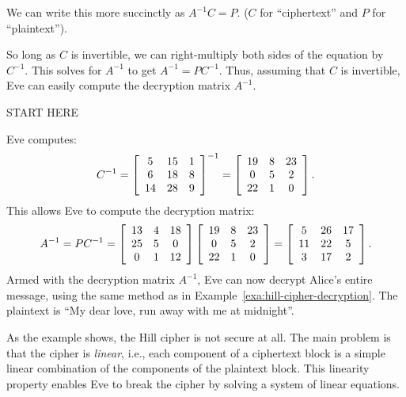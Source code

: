 \documentclass{ximera}
\begin{document}
\begin{solution}
  We can write this more succinctly as $A^{-1}C=P$. ($C$
 for ``ciphertext'' and $P$ for ``plaintext''). 
 
  So long as $C$ is invertible, we can right-multiply 
  both sides of the equation by $C^{-1}$. This solves for $A^{-1}$ to get
  $A^{-1} = PC^{-1}$. Thus, assuming that $C$ is invertible, Eve can
  easily compute the decryption matrix $A^{-1}$. 

  START HERE
  
  Eve computes:
  \begin{equation*}
    C^{-1}
    =
    \startmat{ccc}
      5 & 15 & 1 \\
      6 & 18 & 8 \\
      14 & 28 & 9 \\
    \stopmat^{-1}
    =
    \startmat{ccc}
      19 & 8 & 23 \\
      0 & 5 & 2 \\
      22 & 1 & 0 \\
    \stopmat.
  \end{equation*}
  This allows Eve to compute the decryption matrix:
  \begin{equation*}
    A^{-1}
    =
    PC^{-1}
    =
    \startmat{ccc}
      13 & 4 & 18 \\
      25 & 5 & 0 \\
      0 & 1 & 12 \\
    \stopmat
    \startmat{ccc}
      19 & 8 & 23 \\
      0 & 5 & 2 \\
      22 & 1 & 0 \\
    \stopmat
    =
    \startmat{ccc}
      5  & 26 & 17 \\
      11 & 22 & 5 \\
      3  & 17 & 2 \\
    \stopmat.
  \end{equation*}
  Armed with the decryption matrix $A^{-1}$, Eve can now decrypt
  Alice's entire message, using the same method as in
  Example~\ref{exa:hill-cipher-decryption}. The plaintext is ``My dear
  love, run away with me at midnight''.
\end{solution}

As the example shows, the Hill cipher is not secure at all. The main
problem is that the cipher is {\em linear}, i.e., each component of a
ciphertext block is a simple linear combination of the components of
the plaintext block. This linearity property enables Eve to break the
cipher by solving a system of linear equations.
\end{document}

